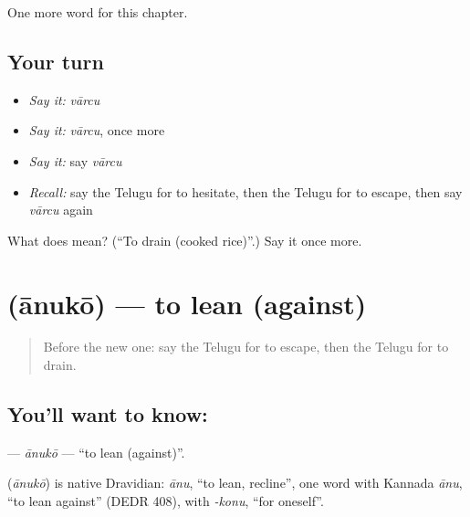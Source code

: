 \begin{grammarlens}[title={What you've built}]
One more word for this chapter.
\end{grammarlens}

\subsection*{Your turn}
\begin{itemize}
\raggedright
  \item \emph{Say it:} \emph{vārcu}
  \item \emph{Say it:} \emph{vārcu}, once more
  \item \emph{Say it:} say \emph{vārcu}
  \item \emph{Recall:} say the Telugu for to hesitate, then the Telugu for to escape, then say \emph{vārcu} again
\end{itemize}

\begin{tcolorbox}[breakable,colback=teal!4,colframe=teal!35!black,title={Before you move on}]
What does  mean? (\textquotedblleft{}To drain (cooked rice)\textquotedblright{}.) Say it once more.
\end{tcolorbox}
\section[\texorpdfstring{\te{ఆనుకో} (ānukō)}{ఆనుకో (ānukō)}]{ (ānukō) — to lean (against)}

\label{lesson:TE-C286-anuko}



\begin{quote}
Before the new one: say the Telugu for to escape, then the Telugu for to drain.
\end{quote}

\subsection*{You'll want to know: }
\textbf{} — \emph{ānukō} — \textquotedblleft{}to lean (against)\textquotedblright{}.

\begin{cousinweb}
\textbf{} (\emph{ānukō}) is native Dravidian: \emph{ānu}, \textquotedblleft{}to lean, recline\textquotedblright{}, one word with Kannada \emph{ānu}, \textquotedblleft{}to lean against\textquotedblright{} (DEDR 408), with \emph{-konu}, \textquotedblleft{}for oneself\textquotedblright{}.
\end{cousinweb}

